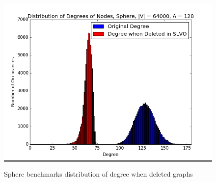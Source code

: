 \documentclass{article}
\begin{document}
\begin{figure}
\begin{minipage}{0.45\textwidth}
    \colorbox{gray}{\includegraphics[width=\linewidth]{./graphs/hist_deg_del_sphere_2.png}}
    \end{minipage}

    \caption{Sphere benchmarks distribution of degree when deleted graphs}
    \label{spheredegdelhists}
\end{figure}
\end{document}
